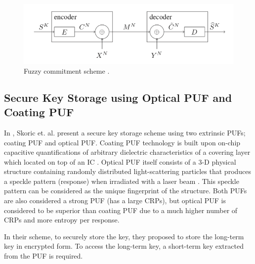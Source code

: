 \begin{figure}[tph!]
    \centerline{\includegraphics[width={\textwidth}]{images/fuzzy_commitment}}
    \caption{Fuzzy commitment scheme \cite{8006840}.}
    \label{fig:fuzzy_commitment}
\end{figure}


\subsection{Secure Key Storage using Optical PUF and Coating PUF}
In \cite{Skoric2007}, Skoric et. al. present a secure key storage scheme using two extrinsic PUFs; coating PUF and optical PUF. Coating PUF technology is built upon on-chip capacitive quantifications of arbitrary dielectric characteristics of a covering layer which located on top of an IC \cite{10.1007/11894063_29}.  Optical PUF itself consists of a 3-D physical structure containing randomly distributed light-scattering particles that produces a speckle pattern (response) when irradiated with a laser beam \cite{Skoric2007}. This speckle pattern can be considered as the unique fingerprint of the structure. Both PUFs are also considered a strong PUF (has a large CRPs), but optical PUF is considered to be superior than coating PUF due to a much higher number of CRPs and more entropy per response.

In their scheme, to securely store the key, they proposed to store the long-term key in encrypted form. To access the long-term key, a short-term key extracted from the PUF is required.

